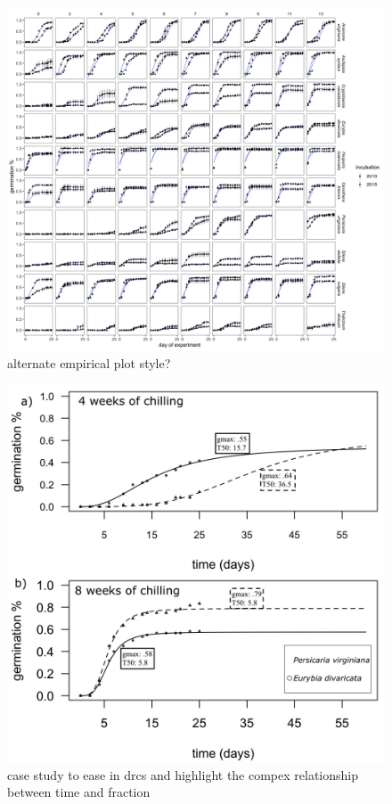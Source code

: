 \documentclass{article}
\begin{document}
\begin{figure}[h!]
  \centering
 \includegraphics[width=\textwidth]{..//plots/germ_courses.jpeg}
    \caption{alternate empirical plot style?}
    \label{Fig:emp2}
\end{figure}

\begin{figure}[h!]
  \centering
 \includegraphics[width=\textwidth]{..//plots/examp_Ed_andPv.jpeg}
    \caption{case study to ease in drcs and highlight the compex relationship between time and fraction}
    \label{Fig:case}
\end{figure}
\end{document}
